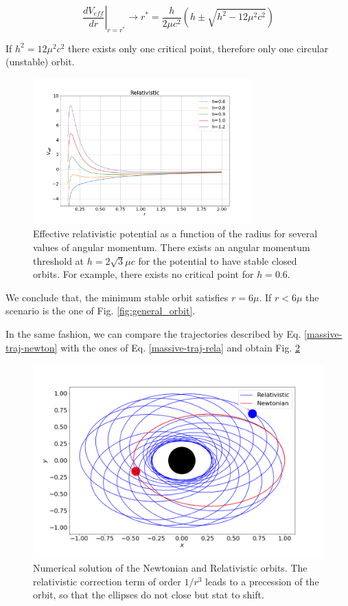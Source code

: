 \documentclass[letterpaper,11pt,onecolumn]{article}
\begin{document}
\begin{equation}
    \left. \frac{dV_{eff}}{dr} \right|_{r=r^*} \longrightarrow r^* = \frac{h}{2\mu c^2} \left( h \pm \sqrt{h^2 - 12 \mu^2 c^2} \right)
\end{equation}

If $h^2 = 12 \mu^2 c^2$ there exists only one critical point, therefore only one circular (unstable) orbit.

\begin{figure}[h!]
    \centering
    \includegraphics[width=0.75\textwidth]{Presentations/Images/2_veff_relat.png}
    \caption{Effective relativistic potential as a function of the radius for several values of angular momentum. There exists an angular momentum threshold at $h=2\sqrt{3} \mu c$ for the potential to have stable closed orbits. For example, there exists no critical point for $h=0.6$.}
    \label{fig:massive-eff-V}
\end{figure}
  

We conclude that, the minimum stable orbit satisfies $r=6\mu$. If $r < 6\mu$ the scenario is the one of Fig. \ref{fig:general_orbit}.

In the same fashion, we can compare the trajectories described by Eq. \ref{massive-traj-newton} with the ones of Eq. \ref{massive-traj-rela} and obtain Fig. \ref{fig:relnew}


\begin{figure}[h!]
    \centering
    \includegraphics[width=0.8\linewidth]{Presentations/Images/2_class_rel_orbit.png}
    \caption{Numerical solution of the Newtonian and Relativistic orbits. The relativistic correction term of order $1/r^{3}$ leads to a precession of the orbit, so that the ellipses do not close but stat to shift.}
    \label{fig:relnew}
\end{figure}
\end{document}
